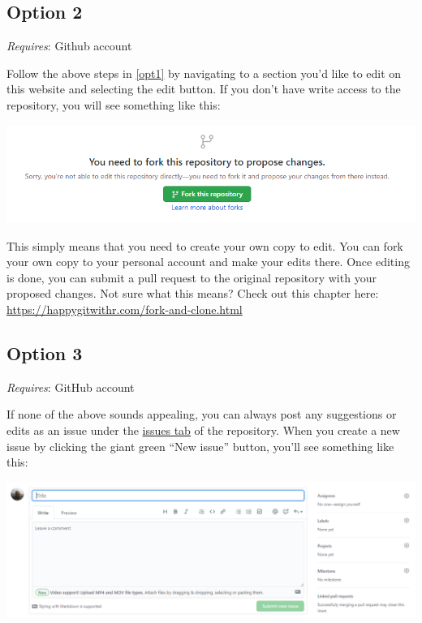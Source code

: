 \documentclass[
]{book}
\begin{document}
\subsection{Option 2}\label{opt2}

\emph{Requires}: Github account

Follow the above steps in \ref{opt1} by navigating to a section you'd like to edit on this website and selecting the edit button. If you don't have write access to the repository, you will see something like this:

\begin{center}\includegraphics[width=1\linewidth]{img/editme3} \end{center}

This simply means that you need to create your own copy to edit. You can fork your own copy to your personal account and make your edits there. Once editing is done, you can submit a pull request to the original repository with your proposed changes. Not sure what this means? Check out this chapter here: \url{https://happygitwithr.com/fork-and-clone.html}

\subsection{Option 3}\label{opt3}

\emph{Requires}: GitHub account

If none of the above sounds appealing, you can always post any suggestions or edits as an issue under the \href{https://github.com/tbep-tech/data-management-sop/issues}{issues tab} of the repository. When you create a new issue by clicking the giant green ``New issue'' button, you'll see something like this:

\begin{center}\includegraphics[width=1\linewidth]{img/issues} \end{center}
\end{document}
